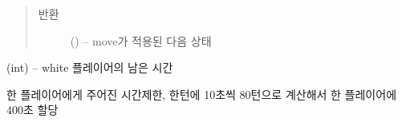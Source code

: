 \documentclass[letterpaper,10pt,english]{sphinxmanual}
\begin{document}
\begin{fulllineitems}
\begin{fulllineitems}
\begin{quote}
\begin{description}
\item[{반환}] \leavevmode
({\hyperref[\detokenize{scripts:scripts.run_game.State}]{}}) -- move가 적용된 다음 상태

\end{description}\end{quote}

\end{fulllineitems}


\begin{fulllineitems}
\label{\detokenize{scripts:scripts.run_game.State.white_remain_sec}}
(int) -- white 플레이어의 남은 시간

\end{fulllineitems}


\end{fulllineitems}


\begin{fulllineitems}
\label{\detokenize{scripts:scripts.run_game.TIME_LIMIT}}
한 플레이어에게 주어진 시간제한,
한턴에 10초씩 80턴으로 계산해서 한 플레이어에 400초 할당

\end{fulllineitems}

\end{document}
